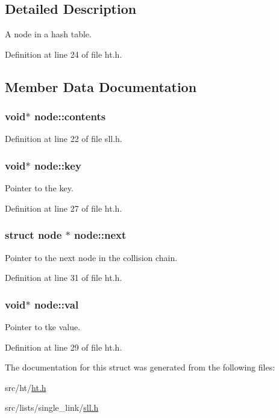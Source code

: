 \subsection{Detailed Description}
A node in a hash table. 

Definition at line 24 of file ht.h.



\subsection{Member Data Documentation}
\hypertarget{structnode_a6658978058886a89ccc39f1d1a56e6d1}{
\subsubsection[{contents}]{\setlength{\rightskip}{0pt plus 5cm}void$\ast$ {\bf node::contents}}}
\label{structnode_a6658978058886a89ccc39f1d1a56e6d1}


Definition at line 22 of file sll.h.

\hypertarget{structnode_a72c8a0c41b801c92db89c5078642f28b}{
\subsubsection[{key}]{\setlength{\rightskip}{0pt plus 5cm}void$\ast$ {\bf node::key}}}
\label{structnode_a72c8a0c41b801c92db89c5078642f28b}


Pointer to the key. 



Definition at line 27 of file ht.h.

\hypertarget{structnode_a111a569ab2765add9b91c9f94cf9f063}{
\subsubsection[{next}]{\setlength{\rightskip}{0pt plus 5cm}struct {\bf node} $\ast$ {\bf node::next}}}
\label{structnode_a111a569ab2765add9b91c9f94cf9f063}


Pointer to the next node in the collision chain. 



Definition at line 31 of file ht.h.

\hypertarget{structnode_a3866f55c05d50265b730d8cdeec0a1f8}{
\subsubsection[{val}]{\setlength{\rightskip}{0pt plus 5cm}void$\ast$ {\bf node::val}}}
\label{structnode_a3866f55c05d50265b730d8cdeec0a1f8}


Pointer to tke value. 



Definition at line 29 of file ht.h.



The documentation for this struct was generated from the following files:\begin{DoxyCompactItemize}
\item 
src/ht/\hyperlink{ht_8h}{ht.h}\item 
src/lists/single\_\-link/\hyperlink{sll_8h}{sll.h}\end{DoxyCompactItemize}
